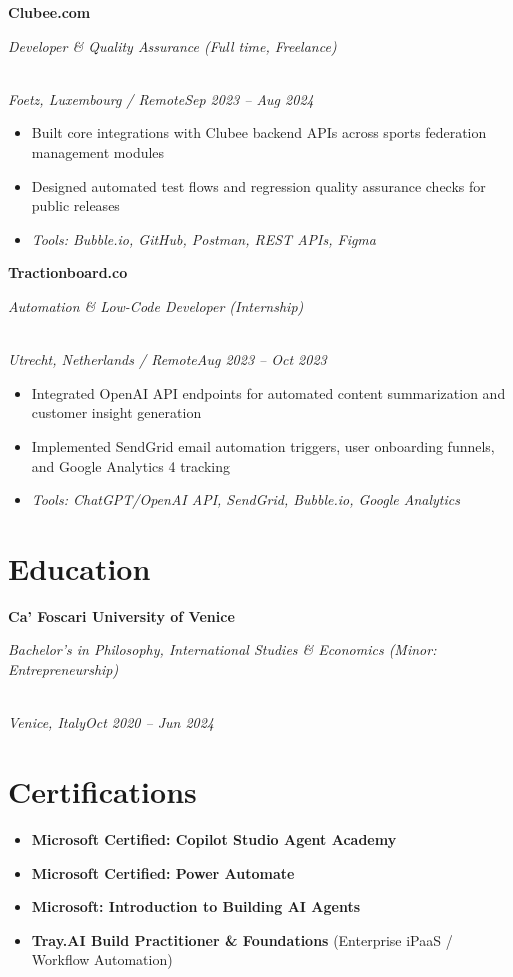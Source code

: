 \documentclass[a4paper,10pt]{article}
\newcommand{\role}[4]{\vspace{2pt}\noindent\hspace{0.6em}\parbox[t]{0.38\textwidth}{\raggedright\textbf{#1}}\hfill\parbox[t]{0.58\textwidth}{\raggedleft\textit{#2}}\\{\textit{#3}\hfill\textit{#4}}\vspace{1pt}}
\begin{document}
\role{Clubee.com}{Developer \& Quality Assurance (Full time, Freelance)}{Foetz, Luxembourg / Remote}{Sep 2023 -- Aug 2024}
\begin{itemize}
\item Built core integrations with Clubee backend APIs across sports federation management modules
\item Designed automated test flows and regression quality assurance checks for public releases
\item \textit{Tools: Bubble.io, GitHub, Postman, REST APIs, Figma}
\end{itemize}

\role{Tractionboard.co}{Automation \& Low-Code Developer (Internship)}{Utrecht, Netherlands / Remote}{Aug 2023 -- Oct 2023}
\begin{itemize}
\item Integrated OpenAI API endpoints for automated content summarization and customer insight generation
\item Implemented SendGrid email automation triggers, user onboarding funnels, and Google Analytics 4 tracking
\item \textit{Tools: ChatGPT/OpenAI API, SendGrid, Bubble.io, Google Analytics}
\end{itemize}

\section{Education}
\role{Ca' Foscari University of Venice}{Bachelor's in Philosophy, International Studies \& Economics (Minor: Entrepreneurship)}{Venice, Italy}{Oct 2020 -- Jun 2024}

\section{Certifications}
\begin{itemize}
\item \textbf{Microsoft Certified: Copilot Studio Agent Academy}
\item \textbf{Microsoft Certified: Power Automate}
\item \textbf{Microsoft: Introduction to Building AI Agents}
\item \textbf{Tray.AI Build Practitioner \& Foundations} (Enterprise iPaaS / Workflow Automation)
\end{itemize}
\end{document}
